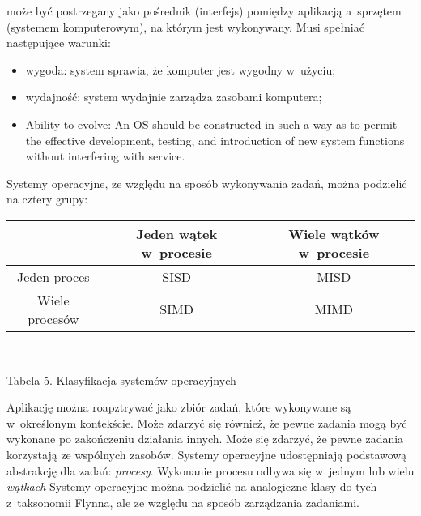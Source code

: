 \documentclass{mwart}
\begin{document}
	może być postrzegany jako pośrednik (interfejs) pomiędzy aplikacją a~sprzętem (systemem komputerowym), na którym jest wykonywany.
	Musi spełniać następujące warunki:
	\begin{itemize}
		\item wygoda: system sprawia, że komputer jest wygodny w~użyciu; %
		\item wydajność: system wydajnie zarządza zasobami komputera; %
		\item Ability to evolve: An OS should be constructed in such a way as to permit the
      effective development, testing, and introduction of new system functions without interfering with service.
	\end{itemize}
\par
%
\indent
	Systemy operacyjne, ze względu na sposób wykonywania zadań, można podzielić na cztery grupy:
	\begin{center}
	\begin{tabular}{|c|c|c|} \hline
													 & Jeden wątek w~procesie   	 & Wiele wątków w~procesie \\\hline
			Jeden proces               &  SISD										   & MISD 			\\\hline
			Wiele procesów             & SIMD                        & MIMD \\\hline
	\end{tabular}\\
	\begin{small} Tabela 5. Klasyfikacja systemów operacyjnych \end{small}
	\end{center}
\par
%
\indent
	Aplikację można roapztrywać jako zbiór zadań, które wykonywane są w~określonym kontekście. Może zdarzyć się również, że pewne zadania
	mogą być wykonane po zakończeniu działania innych. Może się zdarzyć, że pewne zadania korzystają ze wspólnych zasobów.
	Systemy operacyjne udostępniają podstawową abstrakcję dla zadań: \emph{procesy}. Wykonanie procesu odbywa się w~jednym lub wielu \emph{wątkach}
	Systemy operacyjne można podzielić na analogiczne klasy do tych z~taksonomii Flynna, ale ze względu na sposób zarządzania zadaniami.
\par
%
\end{document}
